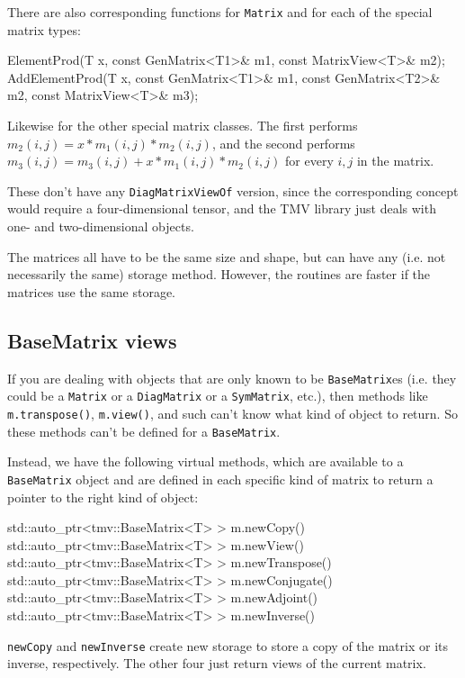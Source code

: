 \documentclass[twoside,letterpaper,11pt]{article}
\renewcommand{\tt}[1]{{\lstinline {#1}}}
\begin{document}
There are also corresponding functions for \tt{Matrix} and for each of the special
matrix types:
\begin{tmvcode}
ElementProd(T x, const GenMatrix<T1>& m1, const MatrixView<T>& m2);
AddElementProd(T x, const GenMatrix<T1>& m1, const GenMatrix<T2>& m2,
      const MatrixView<T>& m3);
\end{tmvcode}
Likewise for the other special matrix classes.  The first performs 
$m_2(i,j) = x * m_1(i,j) * m_2(i,j)$, and the second performs
$m_3(i,j) = m_3(i,j) + x * m_1(i,j) * m_2(i,j)$ for every $i,j$ in the matrix.

These don't have any \tt{DiagMatrixViewOf} version, since the corresponding 
concept would require a four-dimensional tensor, and the TMV library
just deals with one- and two-dimensional objects.

The matrices all have to be the same size and shape, but can have any 
(i.e. not necessarily the same) storage method.  However, the routines are faster
if the matrices use the same storage.

\subsection{BaseMatrix views}
\label{BaseMatrixViews}

If you are dealing with objects that are only known to be \tt{BaseMatrix}es
(i.e. they could be a \tt{Matrix} or a \tt{DiagMatrix} or a \tt{SymMatrix}, etc.),
then methods like \tt{m.transpose()}, \tt{m.view()}, and such
can't know what kind of object to return.
So these methods can't be defined for a \tt{BaseMatrix}.  

Instead, we have the following virtual methods, 
which are available to a \tt{BaseMatrix}
object and are defined in each specific kind of matrix to return a pointer
to the right kind of object:
\begin{tmvcode}
std::auto_ptr<tmv::BaseMatrix<T> > m.newCopy()
std::auto_ptr<tmv::BaseMatrix<T> > m.newView()
std::auto_ptr<tmv::BaseMatrix<T> > m.newTranspose()
std::auto_ptr<tmv::BaseMatrix<T> > m.newConjugate()
std::auto_ptr<tmv::BaseMatrix<T> > m.newAdjoint()
std::auto_ptr<tmv::BaseMatrix<T> > m.newInverse()
\end{tmvcode}
\tt{newCopy} and \tt{newInverse} create new storage to store a copy of the 
matrix or its inverse, respectively.  The other four just return views of the current 
matrix.
\end{document}
